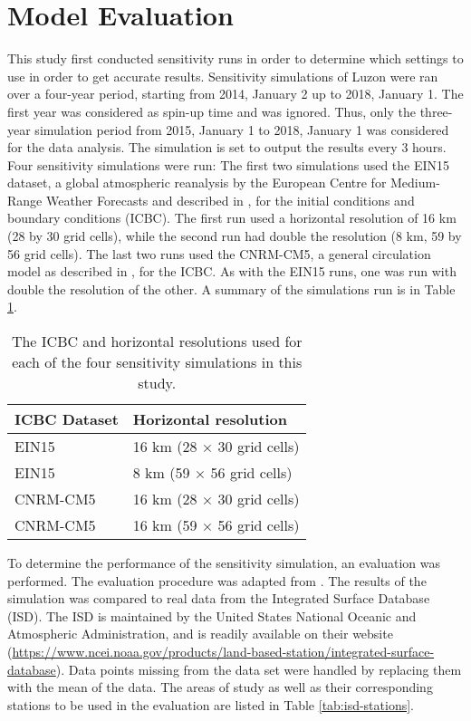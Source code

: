 \section{Model Evaluation}
	This study first conducted sensitivity runs in order to determine which settings to use in order to get accurate results.
	Sensitivity simulations of Luzon were ran over a four-year period, starting from 2014, January 2 up to 2018, January 1.
	The first year was considered as spin-up time and was ignored.
	Thus, only the three-year simulation period from 2015, January 1 to 2018, January 1 was considered for the data analysis.
	The simulation is set to output the results every 3 hours.
	Four sensitivity simulations were run:
	The first two simulations used the EIN15 dataset, a global
	atmospheric reanalysis by the European Centre for
	Medium-Range Weather Forecasts and described in \textcite{Dee2011}, for the initial conditions and boundary
	conditions (ICBC).
	The first run used a horizontal resolution of 16 km (28 by 30 grid cells), while the second run had double the resolution (8 km, 59 by 56 grid cells).
	The last two runs used the CNRM-CM5, a general circulation model as described in \textcite{Voldoire2012}, for the ICBC.
	As with the EIN15 runs, one was run with double the resolution of the other.
	A summary of the simulations run is in Table \ref{tab:summary-sensitivity-runs}.
	\begin{table}[]
		\caption{The ICBC and horizontal resolutions used for each of the four sensitivity simulations in this study.}
		\label{tab:summary-sensitivity-runs}
		\centering
		\begin{tabular}{ll}
			\hline \hline 
			ICBC Dataset & Horizontal resolution \\
			\hline
			EIN15 & 16 km (28 $\times$ 30 grid cells) \\
			EIN15 & 8 km (59 $\times$ 56 grid cells) \\
			CNRM-CM5 & 16 km (28 $\times$ 30 grid cells) \\
			CNRM-CM5 & 16 km (59 $\times$ 56 grid cells) \\
			\hline
		\end{tabular}
	\end{table}
	
	To determine the performance of the sensitivity simulation, an evaluation was performed. The evaluation procedure was adapted from \textcite{Bilang2022}.
	The results of the simulation was compared to real data from the Integrated Surface Database (ISD).
	The ISD is maintained by the United States National Oceanic and Atmospheric Administration, and is readily available on their website 
		(\url{https://www.ncei.noaa.gov/products/land-based-station/integrated-surface-database}).
	Data points missing from the data set were handled by replacing them with the mean of the data.
	The areas of study as well as their corresponding stations to be used in the evaluation are listed in Table \ref{tab:isd-stations}.

